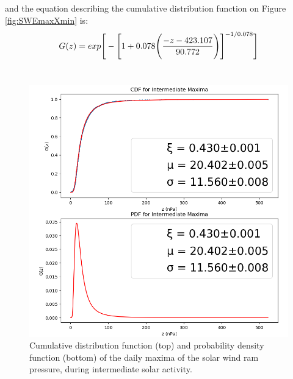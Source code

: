 \documentclass[11pt]{article}
\begin{document}
        and the equation describing the cumulative distribution function on Figure \ref{fig:SWEmaxXmin} is:
        \begin{equation}\\
            G(z) = exp\Bigg [-\Bigg [1+0.078 \Bigg (\frac{-z-423.107}{90.772}\Bigg )\Bigg ]^{-1/0.078}\Bigg ]
        \end{equation}\\
        \begin{figure}[t!]
            \begin{minipage}{0.48\textwidth}
                \centering
                \includegraphics[width=\textwidth]{fig_method/Pintmax.png}
                \caption{Cumulative distribution function (top) and probability density function (bottom) of the daily maxima of the solar wind ram pressure, during intermediate solar activity.}
                \label{fig:Pintmax}
            \end{minipage}
            \hfill
            \begin{minipage}{0.48\textwidth}
                \centering

\end{minipage}
\end{figure}
\end{document}
